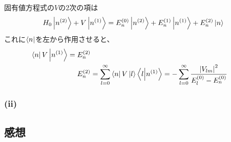 \documentclass[../../sp_2018.tex]{subfiles}
\begin{document}
固有値方程式の\(V\)の2次の項は
\begin{equation}\begin{aligned}[b]
    H_0\ket{n^{(2)}}+V\ket{n^{(1)}} =E_n^{(0)}\ket{n^{(2)}}+E_n^{(1)}\ket{n^{(1)}}+E_n^{(2)}\ket{n}
\end{aligned}\end{equation}
これに\(\bra{n}\)を左から作用させると、
\begin{equation}\begin{aligned}[b]
    \bra{n}V\ket{n^{(1)}} =E_n^{(2)}\\
    E_n^{(2)} &= \sum_{l=0}^{\infty}\bra{n}V\ket{l}\braket{l}{n^{(1)}}=-\sum_{l=0}^{\infty}\frac{\abs{V_{lm}}^2}{E_{l}^{(0)}-E_n^{(0)}}
\end{aligned}\end{equation}


\subsubsection*{(ii)}

\subsection*{感想}
\end{document}
